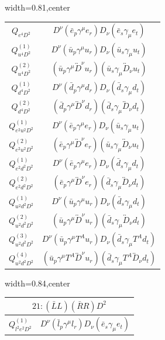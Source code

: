 \begin{table}[H]
\begin{center}
\begin{adjustbox}{width=0.81\textwidth,center}
\begin{minipage}[t]{6.1cm}
\begin{tabular}[t]{c|c}
\hline
$Q_{e^4D^2}$  &  $D^\nu (\bar e_p \gamma^\mu e_r) D_\nu (\bar e_s \gamma_\mu e_t)$  \\
%
$Q_{u^4D^2}^{(1)}$  &  $D^\nu (\bar u_p \gamma^\mu u_r) D_\nu (\bar u_s \gamma_\mu u_t)$  \\
%
$Q_{u^4D^2}^{(2)}$  &  $(\bar u_p \gamma^\mu \overleftrightarrow{D}^\nu u_r) (\bar u_s \gamma_\mu \overleftrightarrow{D}_\nu u_t)$ \\
%
$Q_{d^4D^2}^{(1)}$  &  $D^\nu (\bar d_p \gamma^\mu d_r) D_\nu (\bar d_s \gamma_\mu d_t)$  \\
%
$Q_{d^4D^2}^{(2)}$  &  $(\bar d_p \gamma^\mu \overleftrightarrow{D}^\nu d_r) (\bar d_s \gamma_\mu \overleftrightarrow{D}_\nu d_t)$ \\
%
$Q_{e^2u^2D^2}^{(1)}$  &  $D^\nu (\bar e_p \gamma^\mu e_r) D_\nu (\bar u_s \gamma_\mu u_t)$  \\
%
$Q_{e^2u^2D^2}^{(2)}$  &  $(\bar e_p \gamma^\mu \overleftrightarrow{D}^\nu e_r) (\bar u_s \gamma_\mu \overleftrightarrow{D}_\nu u_t)$ \\
%
$Q_{e^2d^2D^2}^{(1)}$  &  $D^\nu (\bar e_p \gamma^\mu e_r) D_\nu (\bar d_s \gamma_\mu d_t)$  \\
%
$Q_{e^2d^2D^2}^{(2)}$  &  $(\bar e_p \gamma^\mu \overleftrightarrow{D}^\nu e_r) (\bar d_s \gamma_\mu \overleftrightarrow{D}_\nu d_t)$ \\
%
$Q_{u^2d^2D^2}^{(1)}$  &  $D^\nu (\bar u_p \gamma^\mu u_r) D_\nu (\bar d_s \gamma_\mu d_t)$  \\
%
$Q_{u^2d^2D^2}^{(2)}$  &  $(\bar u_p \gamma^\mu \overleftrightarrow{D}^\nu u_r) (\bar d_s \gamma_\mu \overleftrightarrow{D}_\nu d_t)$ \\
%
$Q_{u^2d^2D^2}^{(3)}$  &  $D^\nu (\bar u_p \gamma^\mu T^A u_r) D_\nu (\bar d_s \gamma_\mu T^A d_t)$  \\
%
$Q_{u^2d^2D^2}^{(4)}$  &  $(\bar u_p \gamma^\mu T^A \overleftrightarrow{D}^\nu u_r) (\bar d_s \gamma_\mu T^A \overleftrightarrow{D}_\nu d_t)$
%
\end{tabular}
\end{minipage}
\end{adjustbox}
\begin{adjustbox}{width=0.84\textwidth,center}
\small
\begin{minipage}[t]{5.9cm}
\renewcommand{\arraystretch}{1.5}
\begin{tabular}[t]{c|c}
\multicolumn{2}{c}{\boldmath$21:(\bar L L)(\bar R R)D^2$} \\
\hline
$Q_{l^2e^2D^2}^{(1)}$  &  $D^\nu (\bar l_p \gamma^\mu l_r) D_\nu (\bar e_s \gamma_\mu e_t)$  \\

\end{tabular}
\end{minipage}
\end{adjustbox}
\end{center}
\end{table}

